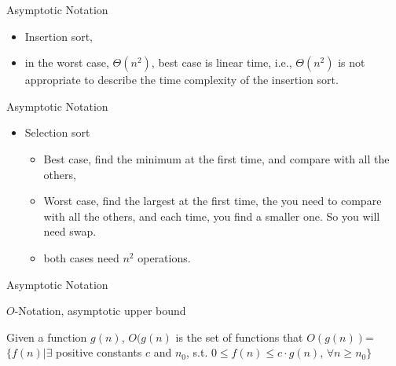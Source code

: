 \documentclass{beamer}
\begin{document}
\begin{frame}{}
\begin{center}
Asymptotic Notation
\end{center}
\begin{itemize}
\item Insertion sort, 
\item { in the worst case, $\Theta(n^2)$, best case is linear time, i.e.,
  $\Theta(n^2)$ is not appropriate to describe the time complexity
 of the insertion sort. } 
\end{itemize}
\end{frame}

\begin{frame}{}
\begin{center}
Asymptotic Notation
\end{center}
\begin{itemize}
\item Selection sort
\begin{itemize}
\item{Best case, find the minimum at the first time, and compare with all the others,}
\item {Worst case, find the largest at the first time, the you need to
 compare with all the others, and each time, you find a smaller one. So you will need swap.}
\item both cases need $n^2$ operations.
\end{itemize}
\end{itemize}
\end{frame}


\begin{frame}{}
\begin{center}
{\large Asymptotic Notation}

{$O$-Notation, asymptotic upper bound}
\end{center}
Given a function $g(n)$, $O(g(n)$ is the set of functions that
$O(g(n))$=$\{f(n)|\exists$ positive constants $c$ and $n_0$, s.t.
$0\le f(n) \le c\cdot g(n)$, $\forall n\ge n_0\}$
\end{frame}
\end{document}
